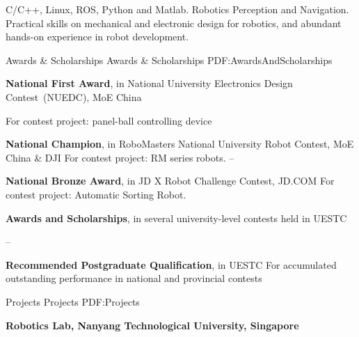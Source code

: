 \documentclass[letterpaper,MMMyyyy,nonstopmode]{simpleresumecv}
\begin{document}
\begin{Body}
\Entry
\BulletItem
C/C++, Linux, ROS, Python and Matlab.
\BulletItem
Robotics Perception and Navigation.
\BulletItem
Practical skills on mechanical and electronic design for robotics, and abundant hands-on experience in robot development.



\Section
{Awards \&\newline
	Scholarships}
{Awards \& Scholarships}
{PDF:AwardsAndScholarships}

\Entry
\textbf{National First Award},
in National University Electronics Design Contest~(NUEDC), 
MoE China

\BulletItem
For contest project: panel-ball controlling device
\hfill
{}

\Gap
\Entry
\textbf{National Champion},
in RoboMasters National University Robot Contest,
MoE China \& DJI
\BulletItem
For contest project: RM series robots.\cite{yijie2016}
\hfill
{} --

\Gap
\Entry
\textbf{National Bronze Award},
in JD X Robot Challenge Contest,
JD.COM
\BulletItem
For contest project: Automatic Sorting Robot.\cite{lxyjd2017}
\hfill
{}

\Gap
\Entry
\textbf{Awards and Scholarships}, 
in several university-level contests held in UESTC

\hfill
{} --

\Gap
\Entry
\textbf{Recommended Postgraduate Qualification},
in UESTC
\BulletItem
For accumulated outstanding performance in national and provincial contests
\hfill
{}



\Section
{Projects}
{Projects}
{PDF:Projects}

\Entry
{\textbf{Robotics Lab, Nanyang Technological University, Singapore}}


\end{Body}
\end{document}
